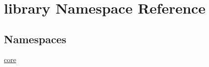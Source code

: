 \hypertarget{namespacelibrary}{}\section{library Namespace Reference}
\label{namespacelibrary}
\subsection*{Namespaces}
\begin{DoxyCompactItemize}
\item 
 \mbox{\hyperlink{namespacelibrary_1_1core}{core}}
\end{DoxyCompactItemize}
